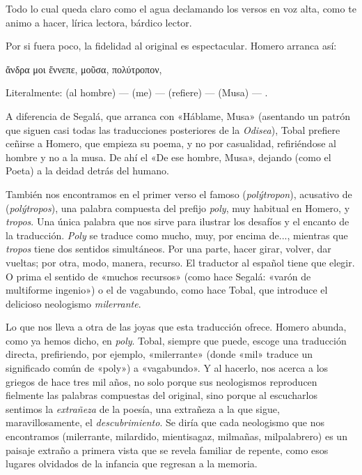 Todo lo cual queda claro como el agua declamando los versos en voz alta, como te animo a hacer, lírica lectora, bárdico lector.

Por si fuera poco, la fidelidad al original es espectacular. Homero arranca así:

\begin{versocita}
\foreignlanguage{greek}{ἄνδρα μοι ἔννεπε, μοῦσα, πολύτροπον,}
\end{versocita}

Literalmente:  (al hombre) ---  (me) ---  (refiere) ---  (Musa) --- .

A diferencia de Segalá, que arranca con «Háblame, Musa» (asentando un patrón que siguen casi todas las traducciones posteriores de la \emph{Odisea}), Tobal prefiere ceñirse a Homero, que empieza su poema, y no por casualidad, refiriéndose al hombre y no a la musa. De ahí el «De ese hombre, Musa», dejando (como el Poeta) a la deidad detrás del humano.

También nos encontramos en el primer verso el famoso  (\emph{polýtropon}), acusativo de  (\emph{polýtropos}), una palabra compuesta del prefijo \emph{poly}, muy habitual en Homero, y \emph{tropos}. Una única palabra que nos sirve para ilustrar los desafíos y el encanto de la traducción. \emph{Poly} se traduce como mucho, muy, por encima de..., mientras que \emph{tropos} tiene dos sentidos simultáneos. Por una parte, hacer girar, volver, dar vueltas; por otra, modo, manera, recurso. El traductor al español tiene que elegir. O prima el sentido de «muchos recursos» (como hace Segalá: «varón de multiforme ingenio») o el de vagabundo, como hace Tobal, que introduce el delicioso neologismo \emph{milerrante}.

Lo que nos lleva a otra de las joyas que esta traducción ofrece. Homero abunda, como ya hemos dicho, en \emph{poly}. Tobal, siempre que puede, escoge una traducción directa, prefiriendo, por ejemplo, «milerrante» (donde «mil» traduce un significado común de «poly») a «vagabundo». Y al hacerlo, nos acerca a los griegos de hace tres mil años, no solo porque sus neologismos reproducen fielmente las palabras compuestas del original, sino porque al escucharlos sentimos la \emph{extrañeza} de la poesía, una extrañeza a la que sigue, maravillosamente, el \emph{descubrimiento}. Se diría que cada neologismo que nos encontramos (milerrante, milardido, mientisagaz, milmañas, milpalabrero) es un paisaje extraño a primera vista que se revela familiar de repente, como esos lugares olvidados de la infancia que regresan a la memoria.

